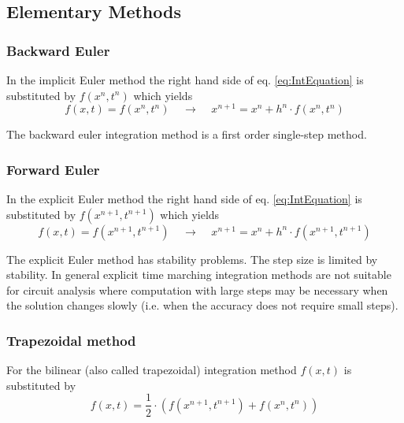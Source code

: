 \subsection{Elementary Methods}

\subsubsection{Backward Euler}

In the implicit Euler method the right hand side of
eq. \eqref{eq:IntEquation} is substituted by $f(x^n, t^n)$ which
yields
\begin{equation}
\label{eq:BEInt}
f(x,t) = f(x^n, t^n)
\;\;\;\; \rightarrow \;\;\;\;
x^{n+1} = x^n + h^n\cdot f(x^n, t^n)
\end{equation}

The backward euler integration method is a first order single-step
method.

\subsubsection{Forward Euler}

In the explicit Euler method the right hand side of
eq. \eqref{eq:IntEquation} is substituted by $f(x^{n+1}, t^{n+1})$ which
yields
\begin{equation}
f(x,t) = f(x^{n+1}, t^{n+1})
\;\;\;\; \rightarrow \;\;\;\;
x^{n+1} = x^n + h^n\cdot f(x^{n+1}, t^{n+1})
\end{equation}

The explicit Euler method has stability problems.  The step size is
limited by stability.  In general explicit time marching integration
methods are not suitable for circuit analysis where computation with
large steps may be necessary when the solution changes slowly
(i.e. when the accuracy does not require small steps).

\subsubsection{Trapezoidal method}

For the bilinear (also called trapezoidal) integration method $f(x,t)$
is substituted by
\begin{equation}
f(x,t) = \dfrac{1}{2}\cdot \left(f(x^{n+1}, t^{n+1}) + f(x^{n}, t^{n})\right)
\end{equation}

